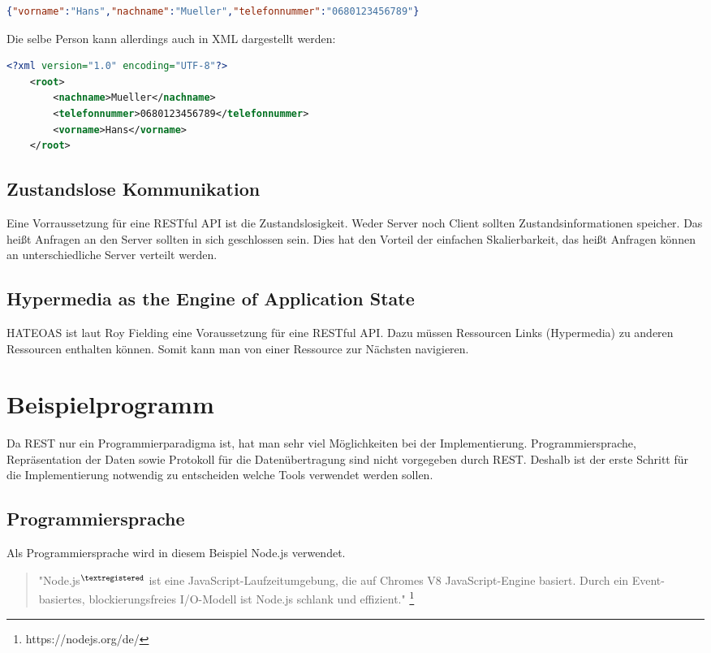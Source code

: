 \documentclass[listof=totoc]{article}
\begin{document}
	
	\begin{lstlisting}[language=json,caption=\ac{JSON}-Repräsentation (application/json)]
		{"vorname":"Hans","nachname":"Mueller","telefonnummer":"0680123456789"}
	\end{lstlisting}
	
	Die selbe Person kann allerdings auch in \ac{XML} dargestellt werden:
	\begin{lstlisting}[language=XML,caption=\ac{XML}-Repräsentation (application/xml)]
	<?xml version="1.0" encoding="UTF-8"?>
	<root>
		<nachname>Mueller</nachname>
		<telefonnummer>0680123456789</telefonnummer>
		<vorname>Hans</vorname>
	</root>
	\end{lstlisting}
	\newpage
	
	
	\subsection{Zustandslose Kommunikation}
	Eine Vorraussetzung für eine \ac{REST}ful \ac{API} ist die Zustandslosigkeit. Weder Server noch Client sollten Zustandsinformationen speicher. Das heißt Anfragen an den Server sollten in sich geschlossen sein. Dies hat den Vorteil der einfachen Skalierbarkeit, das heißt Anfragen können an unterschiedliche Server verteilt werden. \cite[p.~6]{RESTBOOK}
	
	\subsection{Hypermedia as the Engine of Application State}
	\ac{HATEOAS} ist laut Roy Fielding eine Voraussetzung für eine \ac{REST}ful \ac{API}.\cite{HATEOAS_ROY}
	Dazu müssen Ressourcen Links (Hypermedia) zu anderen Ressourcen enthalten können. Somit kann man von einer Ressource zur Nächsten navigieren.
	\newpage
	
	\section{Beispielprogramm}
	Da \ac{REST} nur ein Programmierparadigma ist, hat man sehr viel Möglichkeiten bei der Implementierung. Programmiersprache, Repräsentation der Daten sowie Protokoll für die Datenübertragung sind nicht vorgegeben durch \ac{REST}. Deshalb ist der erste Schritt für die Implementierung notwendig zu entscheiden welche Tools verwendet werden sollen.
	\subsection{Programmiersprache}
	Als Programmiersprache wird in diesem Beispiel Node.js verwendet.
	\begin{quote}
		"Node.js$^{\tiny{\textregistered}}$ ist eine JavaScript-Laufzeitumgebung, die auf Chromes V8 JavaScript-Engine basiert. Durch ein Event-basiertes, blockierungsfreies I/O-Modell ist Node.js schlank und effizient."
		\footnote{https://nodejs.org/de/}
	\end{quote}
\end{document}
